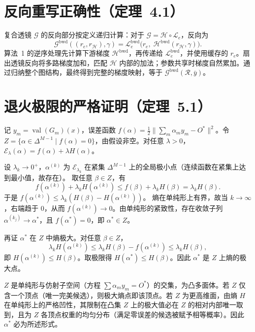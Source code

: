 \documentclass{ctexart}
\DeclareMathOperator{\val}{val}
\begin{document}
\section{反向重写正确性（定理~4.1）}

复合透镜 $\mathcal{G}$ 的反向部分按定义递归计算：对于 $\mathcal{G} = \mathcal{H} \circ \mathcal{L}_e$，反向为
\[
\mathcal{G}^{\mathrm{bwd}}((r_e, r_{\mathcal{H}}), \gamma) = \mathcal{L}_e^{\mathrm{bwd}}\big(r_e,\; \mathcal{H}^{\mathrm{bwd}}(r_{\mathcal{H}}, \gamma)\big).
\]
算法~1 的逆序处理先计算下游梯度 $\mathcal{H}^{\mathrm{bwd}}$，再传递给 $\mathcal{L}_e^{\mathrm{bwd}}$，并使用缓存的 $r_e$。扇出透镜反向将多路梯度加和，匹配 $\mathcal{H}$ 内部的加法；参数共享时梯度自然累加。通过归纳整个图结构，最终得到完整的梯度映射，等于 $\mathcal{G}^{\mathrm{bwd}}(\mathcal{R}, \bar{y})$。

\section{退火极限的严格证明（定理~5.1）}

记 $y_m = \val(G_m)(x)$，误差函数 $f(\alpha) = \frac12 \| \sum_m \alpha_m y_m - O^* \|^2$。令 $Z = \{\alpha \in \Delta^{M-1} \mid f(\alpha)=0\}$，由假设非空。对任意 $\lambda>0$，$\mathcal{E}_\lambda(\alpha) = f(\alpha) + \lambda H(\alpha)$。

设 $\lambda_k \to 0^+$，$\alpha^{(k)}$ 为 $\mathcal{E}_{\lambda_k}$ 在紧集 $\Delta^{M-1}$ 上的全局极小点（连续函数在紧集上达到最小值，故存在）。  
取任意 $\beta \in Z$，有
\[
f(\alpha^{(k)}) + \lambda_k H(\alpha^{(k)}) \le f(\beta) + \lambda_k H(\beta) = \lambda_k H(\beta).
\]
于是 $f(\alpha^{(k)}) \le \lambda_k (H(\beta) - H(\alpha^{(k)}))$。  
熵在单纯形上有界，故当 $k\to\infty$，右端趋于 $0$，从而 $f(\alpha^{(k)}) \to 0$。由单纯形的紧致性，存在收敛子列 $\alpha^{(k_j)} \to \alpha^*$，且 $f(\alpha^*) = 0$，即 $\alpha^* \in Z$。

再证 $\alpha^*$ 在 $Z$ 中熵极大。对任意 $\beta \in Z$，
\[
\lambda_k H(\alpha^{(k)}) \le \lambda_k H(\beta) - f(\alpha^{(k)}) \le \lambda_k H(\beta),
\]
即 $H(\alpha^{(k)}) \le H(\beta)$。取极限得 $H(\alpha^*) \le H(\beta)$。因此 $\alpha^*$ 是 $Z$ 上熵的极大点。

$Z$ 是单纯形与仿射子空间（方程 $\sum \alpha_m y_m = O^*$）的交集，为凸多面体。若 $Z$ 仅含一个顶点（唯一完美候选），则极大熵点即该顶点。若 $Z$ 为更高维面，由熵 $H$ 在单纯形上的严格凹性，其限制在凸集 $Z$ 上的极大值必在 $Z$ 的相对内部唯一取到，且为 $Z$ 各顶点权重的均匀分布（满足零误差的候选被赋予相等概率）。因此 $\alpha^*$ 必为所述形式。
\end{document}
